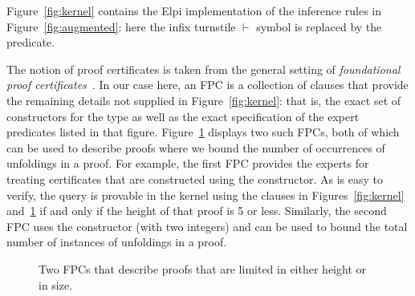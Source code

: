 Figure~\ref{fig:kernel} contains the Elpi implementation of the
inference rules in Figure~\ref{fig:augmented}: here the infix
turnstile $\vdash$ symbol is replaced by the  predicate.
%


{\color{red}}
The notion of proof certificates
 is taken from the general setting of \emph{foundational
  proof certificates}~\cite{chihani17jar}.
%
In our case here, an FPC is a collection of \lP clauses that
provide the remaining details not supplied in Figure~\ref{fig:kernel}:
that is, the exact set of constructors for the  type as
well as the exact specification of the expert predicates listed in
that figure.
%
Figure~\ref{fig:resources} displays two such FPCs,
both of which can be used to describe proofs where we bound
the number of occurrences of unfoldings in a proof.
%
For example, the first FPC
provides the experts for treating certificates that are constructed
using the  constructor.
%
As is easy to verify, the query \mbox{} is
provable in  the kernel using the clauses in Figures~\ref{fig:kernel}
and~\ref{fig:resources} if and only if the height of that proof is 5
or less.
%
Similarly, the second FPC uses the constructor  (with two
integers) and can be used to bound the total number of instances of
unfoldings in a proof.
%

\begin{figure}


\caption{Two FPCs that describe proofs that are limited in either
  height or in size.}
\label{fig:resources}
\end{figure}


